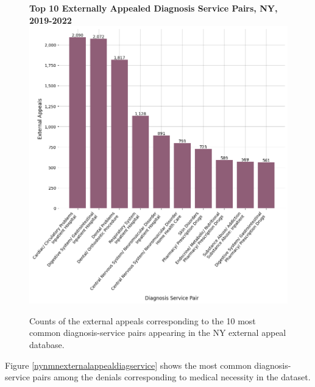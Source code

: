 \documentclass[12pt, a4paper,twoside]{report}
\theoremstyle{plain} %
\theoremstyle{definition} %
\theoremstyle{remark} %
\numberwithin{equation}{chapter}
\begin{document}
		\begin{figure}[h!]
			\centering
			\textbf{Top 10 Externally Appealed Diagnosis Service Pairs, NY, 2019-2022}
			\includegraphics[width=.8\textwidth]{images/nys_external/top_externally_appealed_diag_treatments.png}
			\caption{Counts of the external appeals corresponding to the 10 most common diagnosis-service pairs appearing in the NY external appeal database.}
			\label{nyexternalappealsbydiagservice}
		\end{figure}
	
		Figure \ref{nynmnexternalappealdiagservice} shows the most common diagnosis-service pairs among the denials corresponding to medical necessity in the dataset.
\end{document}
